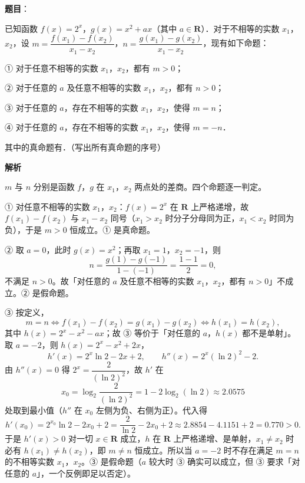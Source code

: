 \begin{answer}

\textbf{题目}：

已知函数 \(f(x)=2^x\)，\(g(x)=x^2+ax\)（其中 \(a\in\mathbf{R}\)）．对于不相等的实数 \(x_1\)，\(x_2\)，设 \(m=\dfrac{f(x_1)-f(x_2)}{x_1-x_2}\)，\(n=\dfrac{g(x_1)-g(x_2)}{x_1-x_2}\)，现有如下命题：

① 对于任意不相等的实数 \(x_1\)，\(x_2\)，都有 \(m>0\)；

② 对于任意的 \(a\) 及任意不相等的实数 \(x_1\)，\(x_2\)，都有 \(n>0\)；

③ 对于任意的 \(a\)，存在不相等的实数 \(x_1\)，\(x_2\)，使得 \(m=n\)；

④ 对于任意的 \(a\)，存在不相等的实数 \(x_1\)，\(x_2\)，使得 \(m=-n\)．

其中的真命题有\gkblank{}．（写出所有真命题的序号）

\textbf{解析}

\(m\) 与 \(n\) 分别是函数 \(f\)，\(g\) 在 \(x_1\)，\(x_2\) 两点处的差商。四个命题逐一判定。

① 对任意不相等的实数 \(x_1\)，\(x_2\)：\(f(x)=2^x\) 在 \(\mathbf{R}\) 上严格递增，故 \(f(x_1)-f(x_2)\) 与 \(x_1-x_2\) 同号（\(x_1>x_2\) 时分子分母同为正，\(x_1<x_2\) 时同为负），于是 \(m>0\) 恒成立。① 是真命题。

② 取 \(a=0\)，此时 \(g(x)=x^2\)；再取 \(x_1=1\)，\(x_2=-1\)，则
\nopagebreak[4]
\[
n=\dfrac{g(1)-g(-1)}{1-(-1)}=\dfrac{1-1}{2}=0,
\]
不满足 \(n>0\)。故「对任意的 \(a\) 及任意不相等的实数 \(x_1\)，\(x_2\)，都有 \(n>0\)」不成立。② 是假命题。

③ 按定义，
\nopagebreak[4]
\[
m=n\iff f(x_1)-f(x_2)=g(x_1)-g(x_2)\iff h(x_1)=h(x_2),
\]
其中 \(h(x)=2^x-x^2-ax\)；故 ③ 等价于「对任意的 \(a\)，\(h(x)\) 都不是单射」。取 \(a=-2\)，则 \(h(x)=2^x-x^2+2x\)，
\nopagebreak[4]
\[
h'(x)=2^x\ln2-2x+2,\qquad h''(x)=2^x(\ln2)^2-2.
\]
由 \(h''(x)=0\) 得 \(2^x=\dfrac{2}{(\ln2)^2}\)，故 \(h'\) 在
\nopagebreak[4]
\[
x_0=\log_2\dfrac{2}{(\ln2)^2}=1-2\log_2(\ln2)\approx2.0575
\]
处取到最小值（\(h''\) 在 \(x_0\) 左侧为负、右侧为正）。代入得
\nopagebreak[4]
\[
h'(x_0)=2^{x_0}\ln2-2x_0+2=\dfrac{2}{\ln2}-2x_0+2\approx2.8854-4.1151+2=0.770>0.
\]
于是 \(h'(x)>0\) 对一切 \(x\in\mathbf{R}\) 成立，\(h\) 在 \(\mathbf{R}\) 上严格递增、是单射，\(x_1\ne x_2\) 时必有 \(h(x_1)\ne h(x_2)\)，即 \(m\ne n\) 恒成立。所以当 \(a=-2\) 时不存在满足 \(m=n\) 的不相等实数 \(x_1\)，\(x_2\)。③ 是假命题（\(a\) 较大时 ③ 确实可以成立，但 ③ 要求「对任意的 \(a\)」，一个反例即足以否定）。


\end{answer}
